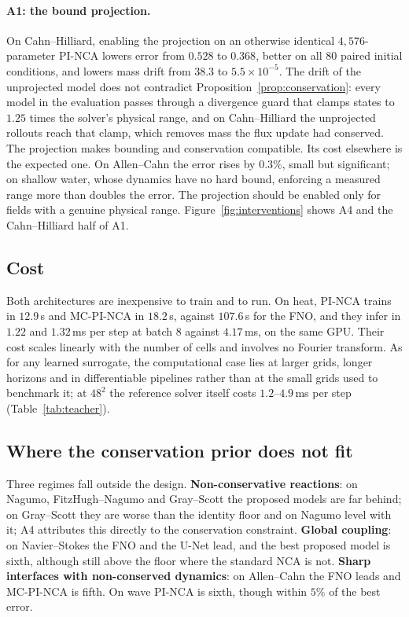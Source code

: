 \documentclass{article}
\begin{document}
\paragraph{A1: the bound projection.} On Cahn--Hilliard, enabling the projection on an
otherwise identical $4{,}576$-parameter PI-NCA lowers error from $0.528$ to $0.368$, better
on all 80 paired initial conditions, and lowers mass drift from $38.3$ to
$5.5\times10^{-5}$. The drift of the unprojected model does not contradict
Proposition~\ref{prop:conservation}: every model in the evaluation passes through a
divergence guard that clamps states to $1.25$ times the solver's physical range, and on
Cahn--Hilliard the unprojected rollouts reach that clamp, which removes mass the flux update
had conserved. The projection makes bounding and conservation compatible. Its cost
elsewhere is the expected one. On Allen--Cahn the error rises by $0.3\%$, small but
significant; on shallow water, whose dynamics have no hard bound, enforcing a measured
range more than doubles the error. The projection
should be enabled only for fields with a genuine physical range.
Figure~\ref{fig:interventions} shows A4 and the Cahn--Hilliard half of A1.



\subsection{Cost}
\label{sec:efficiency}
Both architectures are inexpensive to train and to run. On heat, PI-NCA trains in
$12.9$\,s and MC-PI-NCA in $18.2$\,s, against $107.6$\,s for the FNO, and they infer in
$1.22$ and $1.32$\,ms per step at batch 8 against $4.17$\,ms, on the same GPU. Their cost
scales linearly with the number of cells and involves no Fourier transform. As for any
learned surrogate, the computational case lies at larger grids, longer horizons and in
differentiable pipelines rather than at the small grids used to benchmark it; at $48^2$ the
reference solver itself costs $1.2$--$4.9$\,ms per step (Table~\ref{tab:teacher}).

\subsection{Where the conservation prior does not fit}
\label{sec:scaling}
\label{sec:teachererr}
\label{sec:spectral}
\label{sec:threed}
Three regimes fall outside the design. \textbf{Non-conservative reactions}: on Nagumo,
FitzHugh--Nagumo and Gray--Scott the proposed models are far behind; on Gray--Scott they
are worse than the identity floor and on Nagumo level with it; A4 attributes this directly to the
conservation constraint. \textbf{Global coupling}: on Navier--Stokes the FNO and the U-Net
lead, and the best proposed model is sixth, although still above the floor where the
standard NCA is not. \textbf{Sharp interfaces with non-conserved dynamics}: on Allen--Cahn
the FNO leads and MC-PI-NCA is fifth. On wave PI-NCA is sixth, though within $5\%$ of the
best error.
\end{document}
